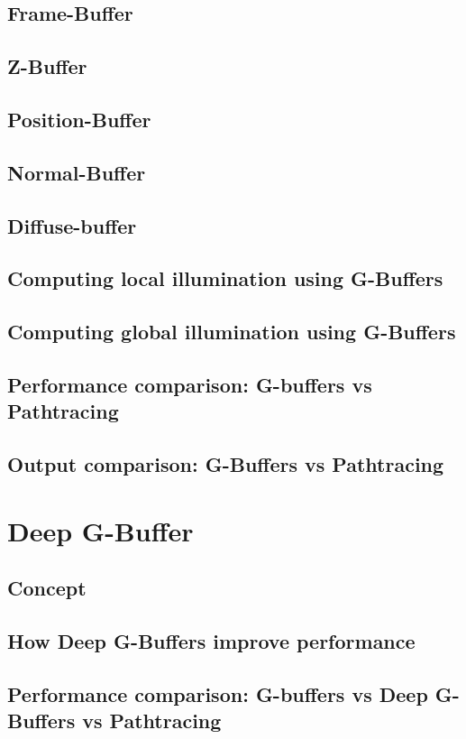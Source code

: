 \documentclass{ACGSeminar}
\begin{document}
	\subsection{Frame-Buffer}
	\subsection{Z-Buffer}
	\subsection{Position-Buffer}
	\subsection{Normal-Buffer}
	\subsection{Diffuse-buffer}
	\subsection{Computing local illumination using G-Buffers}
	\subsection{Computing global illumination using G-Buffers}
	\subsection{Performance comparison: G-buffers vs Pathtracing}
	\subsection{Output comparison: G-Buffers vs Pathtracing}

\section{Deep G-Buffer}
	\subsection{Concept}
	\subsection{How Deep G-Buffers improve performance}
	\subsection{Performance comparison: G-buffers vs Deep G-Buffers vs Pathtracing}
\end{document}
